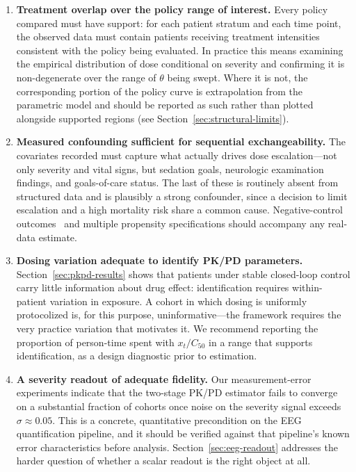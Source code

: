 \begin{enumerate}\setlength{\itemsep}{3pt}
\item \textbf{Treatment overlap over the policy range of interest.} Every policy compared must have
support: for each patient stratum and each time point, the observed data must contain patients
receiving treatment intensities consistent with the policy being evaluated. In practice this means
examining the empirical distribution of dose conditional on severity and confirming it is
non-degenerate over the range of $\theta$ being swept. Where it is not, the corresponding portion of
the policy curve is extrapolation from the parametric model and should be reported as such rather
than plotted alongside supported regions (see Section~\ref{sec:structural-limits}).

\item \textbf{Measured confounding sufficient for sequential exchangeability.} The covariates
recorded must capture what actually drives dose escalation---not only severity and vital signs, but
sedation goals, neurologic examination findings, and goals-of-care status. The last of these is
routinely absent from structured data and is plausibly a strong confounder, since a decision to
limit escalation and a high mortality risk share a common cause. Negative-control
outcomes~\cite{lipsitch2010negative} and multiple propensity specifications should accompany any
real-data estimate.

\item \textbf{Dosing variation adequate to identify PK/PD parameters.} Section~\ref{sec:pkpd-results}
shows that patients under stable closed-loop control carry little information about drug effect:
identification requires within-patient variation in exposure. A cohort in which dosing is uniformly
protocolized is, for this purpose, uninformative---the framework requires the very practice
variation that motivates it. We recommend reporting the proportion of person-time spent with
$x_t/C_{50}$ in a range that supports identification, as a design diagnostic prior to estimation.

\item \textbf{A severity readout of adequate fidelity.} Our measurement-error experiments indicate
that the two-stage PK/PD estimator fails to converge on a substantial fraction of cohorts once noise
on the severity signal exceeds $\sigma \approx 0.05$. This is a concrete, quantitative precondition
on the EEG quantification pipeline, and it should be verified against that pipeline's known error
characteristics before analysis. Section~\ref{sec:eeg-readout} addresses the harder question of
whether a scalar readout is the right object at all.


\end{enumerate}
